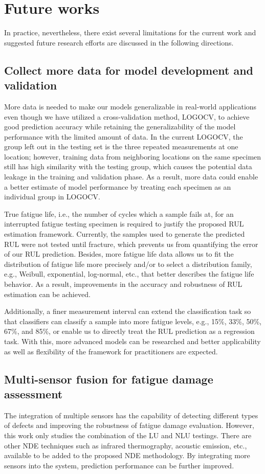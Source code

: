 \section{Future works}
In practice, nevertheless, there exist several limitations for the current work and suggested future research efforts are discussed in the following directions.

\subsection{Collect more data for model development and validation}
More data is needed to make our models generalizable in real-world applications even though we have utilized a cross-validation method, LOGOCV, to achieve good prediction accuracy while retaining the generalizability of the model performance with the limited amount of data. In the current LOGOCV, the group left out in the testing set is the three repeated measurements at one location; however, training data from neighboring locations on the same specimen still has high similarity with the testing group, which causes the potential data leakage in the training and validation phase. As a result, more data could enable a better estimate of model performance by treating each specimen as an individual group in LOGOCV.

True fatigue life, i.e., the number of cycles which a sample fails at, for an interrupted fatigue testing specimen is required to justify the proposed RUL estimation framework. Currently, the samples used to generate the predicted RUL were not tested until fracture, which prevents us from quantifying the error of our RUL prediction. Besides, more fatigue life data allows us to fit the distribution of fatigue life more precisely and/or to select a distribution family, e.g., Weibull, exponential, log-normal, etc., that better describes the fatigue life behavior. As a result, improvements in the accuracy and robustness of RUL estimation can be achieved.

Additionally, a finer measurement interval can extend the classification task so that classifiers can classify a sample into more fatigue levels, e.g., 15\%, 33\%, 50\%, 67\%, and 85\%, or enable us to directly treat the RUL prediction as a regression task. With this, more advanced models can be researched and better applicability as well as flexibility of the framework for practitioners are expected.

\subsection{Multi-sensor fusion for fatigue damage assessment}
The integration of multiple sensors has the capability of detecting different types of defects and improving the robustness of fatigue damage evaluation. However, this work only studies the combination of the LU and NLU testings. There are other NDE techniques such as infrared thermography, acoustic emission, etc., available to be added to the proposed NDE methodology. By integrating more sensors into the system, prediction performance can be further improved.

